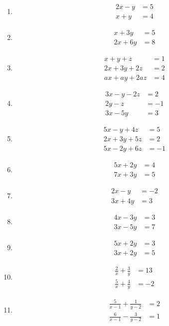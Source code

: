 \begin{multicols}{2}
\begin{enumerate}[label=\thesubsection.\arabic*,ref=\thesubsection.\theenumi]
\item
\begin{align*}
 2x-y &= 5\\
 x+y &= 4
\end{align*}
\item
\begin{align*}
 x+3y &= 5\\
 2x+6y&= 8
\end{align*}
\item
\begin{align*}
 x+y+z &= 1\\
 2x+3y+2z &= 2\\
 ax+ay+2az &= 4
\end{align*}
\item
\begin{align*}
 3x-y-2z &= 2\\
 2y-z &= -1\\
 3x-5y &= 3
\end{align*}
\item 
\begin{align*}
 5x-y+4z &= 5\\
 2x+3y+5z &= 2\\
 5x-2y+6z &= -1
\end{align*}
\item   
\begin{align*}
5x+2y &= 4\\
7x+3y &= 5
\end{align*}
\item 
\begin{align*}
 2x-y &= -2\\
 3x+4y &= 3
\end{align*}
\item
\begin{align*}
 4x-3y &= 3\\
 3x-5y &= 7
\end{align*}
\item
\begin{align*} 
 5x+2y &= 3\\
 3x+2y &= 5
\end{align*}
\item 
\begin{align*}
\frac{2}{x}+\frac{3}{y}&= 13 \\ \frac{5}{x}+\frac{4}{y} &= -2
\end{align*}
\item 
\begin{align*}
\frac{5}{x-1}+\frac{1}{y-2}&= 2 \\ \frac{6}{x-1}-\frac{3}{y-2}&= 1

\end{align*}
\end{enumerate}
\end{multicols}
